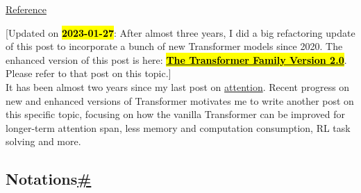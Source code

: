 \hyperref[reference]{Reference}

{{[}Updated on \hl{\textbf{2023-01-27}}: After almost three years, I did a big refactoring update of this post to incorporate a bunch of new Transformer models since 2020. The enhanced version of this post is here: \href{https://lilianweng.github.io/posts/2023-01-27-the-transformer-family-v2/}{\hl{\textbf{The Transformer Family Version 2.0}}}. Please refer to that post on this topic.{]}}\\

It has been almost two years since my last post on \href{https://lilianweng.github.io/posts/2018-06-24-attention/}{attention}. Recent progress on new and enhanced versions of Transformer motivates me to write another post on this specific topic, focusing on how the vanilla Transformer can be improved for longer-term attention span, less memory and computation consumption, RL task solving and more.

\subsection{\texorpdfstring{Notations\hyperref[notations]{\#}}{Notations\#}}\label{notations}

